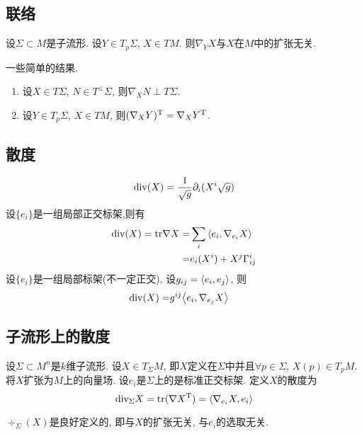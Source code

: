 \subsection{联络}
\begin{proposition}
    设$\Sigma \subset M$是子流形.  设$Y \in T_p\Sigma$, $X \in TM$. 则$\nabla_YX$与$X$在$M$中的扩张无关.
\end{proposition}
一些简单的结果.
\begin{enumerate}
    \item 设$X\in T\Sigma$, $N \in T^\perp\Sigma$, 则$\nabla_X N \perp T\Sigma$.
    \item 设$Y \in T_p \Sigma$, $X \in TM$, 则$(\nabla_XY)^{\text{T}}=\nabla_X{Y^{\text{T}}}$.
\end{enumerate}
\subsection{散度}
\begin{equation}
    {\text{div}}(X)={{\frac{1}{\sqrt{g}}}}{\partial}_i(X^i\sqrt{g})
\end{equation}
设$\{e_i\}$是一组局部正交标架,则有
\begin{equation}
    \begin{split}
        {\text{div}}(X)={\text{tr}}\nabla X=&\sum_i {\left < e_i, \nabla_{e_i}X \right >} \\
        =&e_i(X^i)+X^j\Gamma^i_{ij}
    \end{split}
\end{equation}
设$\{e_i\}$是一组局部标架(不一定正交), 设$g_{ij}={\left < e_i, e_j \right >}$, 则
\begin{equation}
    \begin{split}
        {\text{div}}(X)=&g^{ij}{\left < e_i, \nabla_{e_j}X \right >}
    \end{split}
\end{equation}
\subsection{子流形上的散度}
设$\Sigma \subset M^n$是$k$维子流形. 设$X \in T_\Sigma M$, 即$X$定义在$\Sigma$中并且$\forall p \in \Sigma$, $X(p) \in T_pM$. 将$X$扩张为$M$上的向量场.  设$e_i$是$\Sigma$上的是标准正交标架. 定义$X$的散度为
\begin{equation}
    {\text{div}}_\Sigma X={\text{tr}}(\nabla X^{\text{T}})={\left < \nabla_{e_i}X, e_i \right >}
\end{equation}
\begin{proposition}
    $\div_\Sigma(X)$是良好定义的, 即与$X$的扩张无关, 与$e_i$的选取无关.
\end{proposition}
